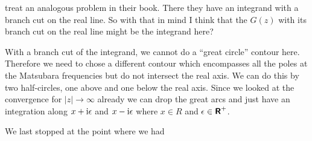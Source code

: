 \documentclass[11pt, english, fleqn, DIV=15, headinclude, BCOR=1cm]{scrartcl}
\begin{document}
\Textcite[Section~11.4.2]{Bruus/Many-Body} treat an analogous problem in their
book. There they have an integrand with a branch cut on the real line. So with
that in mind I think that the $G(z)$ with its branch cut on the real line might
be the integrand here?

With a branch cut of the integrand, we cannot do a \enquote{great circle}
contour here. Therefore we need to chose a different contour which encompasses
all the poles at the Matsubara frequencies but do not intersect the real axis.
We can do this by two half-circles, one above and one below the real axis.
Since we looked at the convergence for $|z| \to \infty$ already we can drop the
great arcs and just have an integration along $x + \mathrm i \epsilon$ and $x - \mathrm i
\epsilon$ where $x \in R$ and $\epsilon \in \text{\bfseries\sffamily R}^+$.

We last stopped at the point where we had
\end{document}
